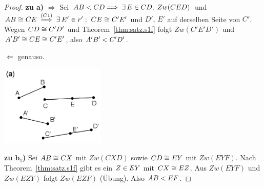 \begin{proof}
{\bf zu a)}  \glqq{}$\Longrightarrow$\grqq{} Sei
    ${AB}<{CD} \Longrightarrow\;\exists\,E\in{CD},\;Zw(CED)$
    und  ${AB}\cong{CE}\;\stackrel{(C1)}{\Longrightarrow}\;
    \exists\,E'\in r':\;{CE}\cong{C'E'}$ und $D',\,E'$ auf
    derselben Seite von $C'$. Wegen ${CD}\cong{C'D'}$ und
    Theorem~\ref{thm:satz.s1f} folgt $Zw(C'E'D')$ und
    ${A'B'}\cong{CE}\cong{C'E'}$, also
    ${A'B'}<{C'D'}$.

    \glqq{}$\Longleftarrow$\grqq{} genauso.


\centerline{\includegraphics[width=5cm]{BILDER/1-2-06a-Ord.png}}








{\bf zu $\mathbf b_1$)} 
Sei ${AB}\cong{CX}$ mit $Zw(CXD)$ sowie ${CD}\cong{EY}$ mit
$Zw(EYF)$. Nach Theorem~\ref{thm:satz.s1f} gibt es ein $Z\in{EY}$
mit ${CX}\cong{EZ}$. Aus $Zw(EYF)$
und $Zw(EZY)$ folgt   %
$Zw(EZF)$ (Übung). %
Also ${AB}<{EF}$.



\end{proof}

